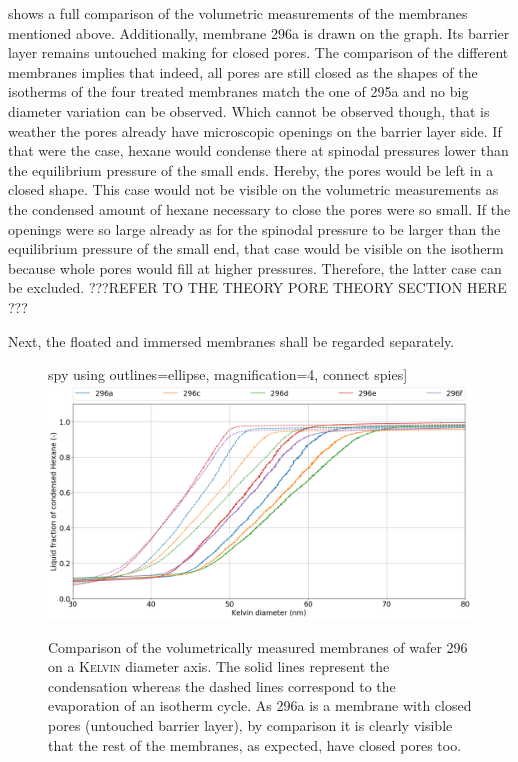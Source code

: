 \documentclass[thesis.tex]{subfiles}
\begin{document}
         shows a full comparison of the volumetric measurements of the membranes mentioned above. Additionally, membrane 296a is drawn on the graph. Its barrier layer remains untouched making for closed pores. The comparison of the different membranes implies that indeed, all pores are still closed as the shapes of the isotherms of the four treated membranes match the one of 295a and no big diameter variation can be observed. Which cannot be observed though, that is weather the pores already have microscopic openings on the barrier layer side. If that were the case, hexane would condense there at spinodal pressures lower than the equilibrium pressure of the small ends. Hereby, the pores would be left in a closed shape. This case would not be visible on the volumetric measurements as the condensed amount of hexane necessary to close the pores were so small. If the openings were so large already as for the spinodal pressure to be larger than the equilibrium pressure of the small end, that case would be visible on the isotherm because whole pores would fill at higher pressures. Therefore, the latter case can be excluded.
        ???REFER TO THE THEORY PORE THEORY SECTION HERE ???

        Next, the floated and immersed membranes shall be regarded separately.

        \begin{figure}[ht]
            \centering
			spy using outlines={ellipse, magnification=4, connect spies}]
        \def\PrelMin{.86}
            \includegraphics[width=\textwidth]{images/296a_vs_296c_vs_296d_vs_296e_vs_296f_d_kelvin.png}
            \caption{Comparison of the volumetrically measured membranes of wafer 296 on a \textsc{Kelvin} diameter axis. The solid lines represent the condensation whereas the dashed lines correspond to the evaporation of an isotherm cycle. As 296a is a membrane with closed pores (untouched barrier layer), by comparison it is clearly visible that the rest of the membranes, as expected, have closed pores too.}
            \label{fig:full-comp-w296}
        \end{figure}
\end{document}
